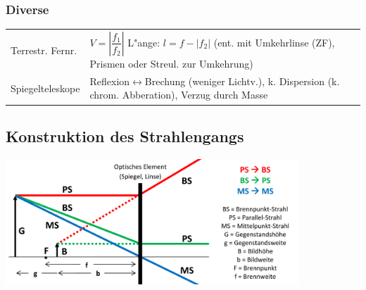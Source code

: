 \subsubsection{Diverse  }
\begin{tabular}{ll}
  Terrestr. Fernr. & 
  $V=\left|\dfrac{f_1}{f_2}\right|$ \qquad L"ange: $l=f-|f_2|$ (ent. mit
  Umkehrlinse (ZF), Prismen oder Streul. zur Umkehrung) \\
  Spiegelteleskope &
  Reflexion$\leftrightarrow$Brechung (weniger Lichtv.), k. Dispersion (k. chrom.
  Abberation), Verzug durch Masse  \\
\end{tabular}

\subsection{Konstruktion des Strahlengangs}
\begin{center}
  \includegraphics[width=11cm]{./bilder/strahlengang.png}
\end{center}
